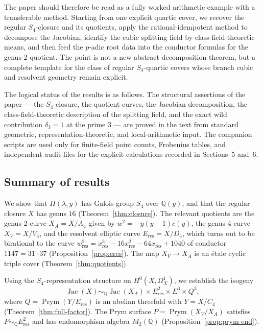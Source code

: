 \documentclass[11pt,letterpaper]{article}
\theoremstyle{plain}
\theoremstyle{remark}
\newcommand{\QQ}{\mathbb{Q}}
\newcommand{\Jac}{\operatorname{Jac}}
\newcommand{\Prym}{\operatorname{Prym}}
\begin{document}
The paper should therefore be read as a fully worked arithmetic example with a transferable method. Starting from one explicit quartic cover, we recover the regular \(S_4\)-closure and its quotients, apply the rational-idempotent method to decompose the Jacobian, identify the cubic splitting field by class-field-theoretic means, and then feed the \(p\)-adic root data into the conductor formulas for the genus-\(2\) quotient. The point is not a new abstract decomposition theorem, but a complete template for the class of regular \(S_4\)-quartic covers whose branch cubic and resolvent geometry remain explicit.

The logical status of the results is as follows. The structural assertions of the paper --- the \(S_4\)-closure, the quotient curves, the Jacobian decomposition, the class-field-theoretic description of the splitting field, and the exact wild contribution \(\delta_3=1\) at the prime \(3\) --- are proved in the text from standard geometric, representation-theoretic, and local-arithmetic input. The companion scripts are used only for finite-field point counts, Frobenius tables, and independent audit files for the explicit calculations recorded in Sections~5 and~6.

\subsection{Summary of results}
We show that \(\Pi(\lambda,y)\) has Galois group \(S_4\) over \(\QQ(y)\), and that the regular closure \(X\) has genus \(16\) (Theorem~\ref{thm:closure}). The relevant quotients are the genus-\(2\) curve \(X_A=X/A_4\) given by \(w^2=-y(y-1)c(y)\), the genus-\(4\) curve \(X_V=X/V_4\), and the resolvent elliptic curve \(E_{\mathrm{res}}=X/D_4\), which turns out to be birational to the curve \(w_{\mathrm{res}}^2=x_{\mathrm{res}}^3-16x_{\mathrm{res}}^2-64x_{\mathrm{res}}+1040\) of conductor \(1147=31\cdot 37\) (Proposition~\ref{prop:eres}). The map \(X_V\to X_A\) is an \'etale cyclic triple cover (Theorem~\ref{thm:quotients}).

Using the \(S_4\)-representation structure on \(H^0(X,\Omega_X^1)\), we establish the isogeny
\[
\Jac(X)\sim_{\QQ}\Jac(X_A)\times E_{\mathrm{res}}^2\times E^3\times Q^3,
\]
where \(Q=\Prym(Y/E_{\mathrm{res}})\) is an abelian threefold with \(Y=X/C_4\) (Theorem~\ref{thm:full-factor}). The Prym surface \(P=\Prym(X_V/X_A)\) satisfies \(P\sim_{\QQ}E_{\mathrm{res}}^2\) and has endomorphism algebra \(M_2(\QQ)\) (Proposition~\ref{prop:prym-end}).
\end{document}
